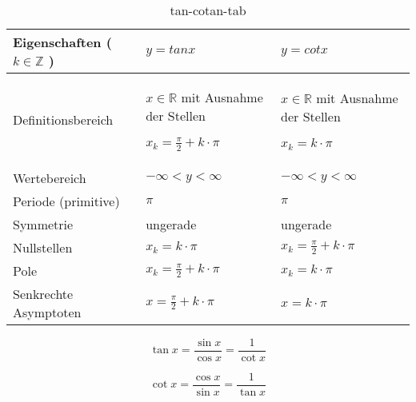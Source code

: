 \begin{table}[H]
\begin{tabular}{|l|l|l|}
\hline
Eigenschaften    ( $k \in \mathbb { Z }$ )     & $y= tan x$ & $y= cot x$ \\ \hline \hline
Definitionsbereich    &    \parbox[t]{2in}{ $x \in \mathbb { R }$ mit Ausnahme der Stellen \par  $x _ { k } = \frac { \pi } { 2} + k \cdot \pi$   }  &   \parbox[t]{2in}{   $x \in \mathbb { R }$ mit Ausnahme der Stellen  \par  $x _ { k } =  k \cdot \pi$   }    \\ 
Wertebereich          &   $- \infty < y < \infty$       &  $- \infty < y < \infty$          \\ 
Periode (primitive)   &   $\pi$       &      $\pi$     \\ 
Symmetrie             &    ungerade      &  ungerade         \\ 
Nullstellen           &     $x _ { k } = k \cdot \pi$     &      $x _ { k } = \frac { \pi } { 2} + k \cdot \pi$     \\ 
Pole                  &    $x _ { k } = \frac { \pi } { 2} + k \cdot \pi$      &    $x _ { k } = k \cdot \pi$       \\ 
Senkrechte Asymptoten &    $x = \frac { \pi } { 2} + k \cdot \pi$      &      $x = k \cdot \pi$        \\ \hline
\end{tabular}
\caption{tan-cotan-tab}
\label{tan-cotan-tab}
\end{table}

\begin{leftbar}
\noindent\begin{minipage}{.5\linewidth}
\begin{equation}
\tan x = \frac { \sin x } { \cos x } = \frac { 1} { \cot x }
\end{equation}
\end{minipage}
\begin{minipage}{.5\linewidth}
\begin{equation}
\cot x = \frac { \cos x } { \sin x } = \frac { 1} { \tan x }
\end{equation}
\end{minipage}
\end{leftbar}